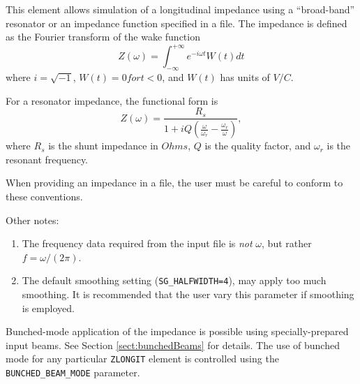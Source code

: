 This element allows simulation of a longitudinal impedance using a
``broad-band'' resonator or an impedance function specified in a file.
The impedance is defined as the Fourier transform of the wake function
\begin{equation}
Z(\omega) = \int_{-\infty}^{+\infty} e^{-i \omega t} W(t) dt
\end{equation}
where $i = \sqrt{-1}$, $W(t)=0 for t<0$, and $W(t)$ has units of $V/C$.

For a resonator impedance, the functional form is
\begin{equation}
Z(\omega) = \frac{R_s}{1 + iQ(\frac{\omega}{\omega_r} - \frac{\omega_r}{\omega})},
\end{equation}
where $R_s$ is the shunt impedance in $Ohms$, $Q$ is the quality
factor, and $\omega_r$ is the resonant frequency.

When providing an impedance in a file, the user must be careful to conform to these
conventions.

Other notes:
\begin{enumerate}
\item The frequency data required from the input file is {\em not} $\omega$, but rather
  $f = \omega/(2 \pi)$.
\item The default smoothing setting ({\tt SG\_HALFWIDTH=4}), may apply too much smoothing.
It is recommended that the user vary this parameter if smoothing is employed.
\end{enumerate}

Bunched-mode application of the impedance is possible using specially-prepared input
beams. 
See Section \ref{sect:bunchedBeams} for details.
The use of bunched mode for any particular \verb|ZLONGIT| element is controlled using the \verb|BUNCHED_BEAM_MODE| parameter.
